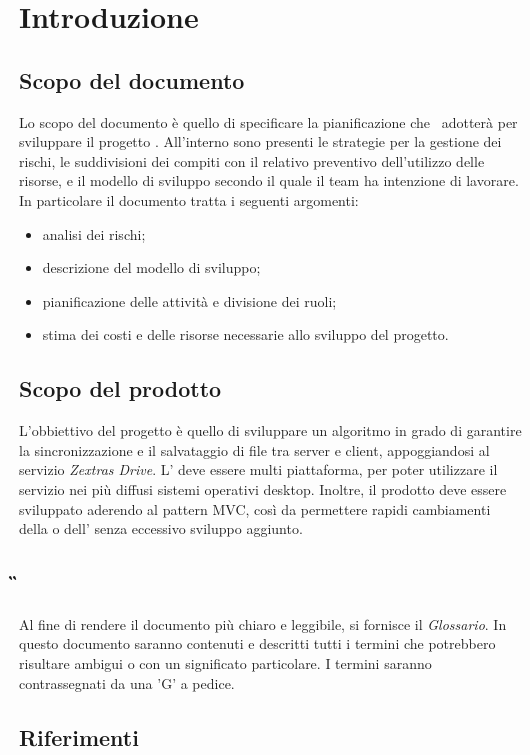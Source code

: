\section{Introduzione}
\subsection{Scopo del documento}
Lo scopo del documento è quello di specificare la pianificazione che \Gruppo \, adotterà per sviluppare il progetto \NomeProgetto. All'interno sono presenti le strategie per la gestione dei rischi, le suddivisioni dei compiti con il relativo preventivo dell'utilizzo delle risorse, e il modello di sviluppo secondo il quale il team ha intenzione di lavorare.
In particolare il documento tratta i seguenti argomenti:
\begin{itemize}
\item analisi dei rischi;
\item descrizione del modello di sviluppo;
\item pianificazione delle attività e divisione dei ruoli;
\item stima dei costi e delle risorse necessarie allo sviluppo del progetto.
\end{itemize}
\subsection{Scopo del prodotto}
L'obbiettivo del progetto è quello di sviluppare un algoritmo in grado di garantire la sincronizzazione e il salvataggio di file tra server e client, appoggiandosi al servizio \textit{Zextras Drive}.
L' deve essere multi piattaforma, per poter utilizzare il servizio nei più diffusi sistemi operativi desktop.
Inoltre, il prodotto deve essere sviluppato aderendo al pattern MVC, così da permettere rapidi cambiamenti della  o dell' senza eccessivo sviluppo aggiunto.
\subsection{\G{}}
Al fine di rendere il documento più chiaro e leggibile, si fornisce il \textit{Glossario}. In questo documento saranno contenuti e descritti tutti i termini che potrebbero risultare ambigui o con un significato particolare. I termini saranno contrassegnati da una 'G' a pedice.
\subsection{Riferimenti}
